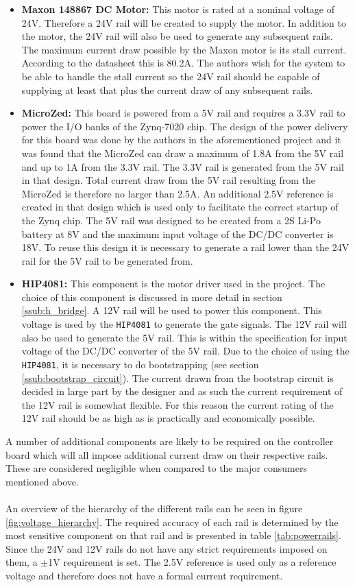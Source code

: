 \begin{itemize}
	\item \textbf{Maxon 148867 DC Motor:} This motor is rated at a nominal voltage of 24V.
	Therefore a 24V rail will be created to supply the motor.
	In addition to the motor, the 24V rail will also be used to generate any subsequent rails.
	The maximum current draw possible by the Maxon motor is its stall current. 
	According to the datasheet \cite{maxon} this is 80.2A.
	The authors wish for the system to be able to handle the stall current so the 24V rail should be capable of supplying at least that plus the current draw of any subsequent rails.
	\item  \textbf{MicroZed:} This board is powered from a 5V rail and requires a 3.3V rail to power the I/O banks of the Zynq-7020 chip.
	The design of the power delivery for this board was done by the authors in the aforementioned project \cite{isaswarm} and it was found that the MicroZed can draw a maximum of 1.8A from the 5V rail and up to 1A from the 3.3V rail.
	The 3.3V rail is generated from the 5V rail in that design.
	Total current draw from the 5V rail resulting from the MicroZed is therefore no larger than 2.5A.
	An additional 2.5V reference is created in that design which is used only to facilitate the correct startup of the Zynq chip.
	The 5V rail was designed to be created from a 2S Li-Po battery at 8V and the maximum input voltage of the DC/DC converter is 18V.
	To reuse this design it is necessary to generate a rail lower than the 24V rail for the 5V rail to be generated from.
	\item \textbf{HIP4081:} This component is the motor driver used in the project.
	The choice of this component is discussed in more detail in section \ref{ssub:h_bridge}.
	A 12V rail will be used to power this component. 
	This voltage is used by the \texttt{HIP4081} to generate the gate signals.
	The 12V rail will also be used to generate the 5V rail.
	This is within the specification for input voltage of the DC/DC converter of the 5V rail. 
	Due to the choice of using the \texttt{HIP4081}, it is necessary to do bootstrapping (see section \ref{ssub:bootstrap_circuit}). 
	The current drawn from the bootstrap circuit is decided in large part by the designer and as such the current requirement of the 12V rail is somewhat flexible.
	For this reason the current rating of the 12V rail should be as high as is practically and economically possible.
\end{itemize}
A number of additional components are likely to be required on the controller board which will all impose additional current draw on their respective rails.
These are considered negligible when compared to the major consumers mentioned above.
\\~\\
An overview of the hierarchy of the different rails can be seen in figure \ref{fig:voltage_hierarchy}.
The required accuracy of each rail is determined by the most sensitive component on that rail and is presented in table \ref{tab:powerrails}.
Since the 24V and 12V rails do not have any strict requirements imposed on them, a $\pm$1V requirement is set. 
The 2.5V reference is used only as a reference voltage and therefore does not have a formal current requirement.

